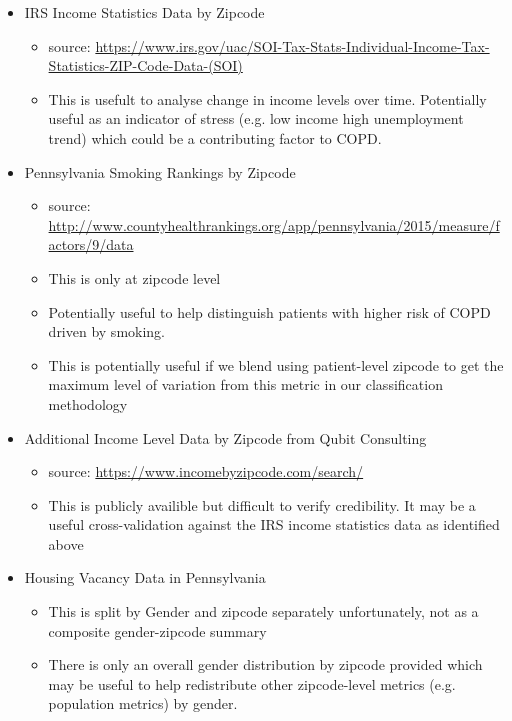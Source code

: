 \documentclass{article}
\begin{document}
\begin{itemize}
  \item  IRS Income Statistics Data by Zipcode
  \begin{itemize}
    \item source: \url{https://www.irs.gov/uac/SOI-Tax-Stats-Individual-Income-Tax-Statistics-ZIP-Code-Data-(SOI)}
    \item This is usefult to analyse change in income levels over time. 
          Potentially useful as an indicator of stress (e.g. low income high 
          unemployment trend) which could be a contributing factor to COPD.
  \end{itemize}
  \item Pennsylvania Smoking Rankings by Zipcode
  \begin{itemize}
    \item source: \url{http://www.countyhealthrankings.org/app/pennsylvania/2015/measure/factors/9/data}
    \item This is only at zipcode level
    \item Potentially useful to help distinguish patients with higher risk of
          COPD driven by smoking.
    \item This is potentially useful if we blend using patient-level zipcode 
          to get the maximum level of variation from this metric in 
          our classification methodology
  \end{itemize}
  \item Additional Income Level Data by Zipcode from Qubit Consulting
  \begin{itemize}
    \item source: \url{https://www.incomebyzipcode.com/search/}
    \item This is publicly availible but difficult to verify credibility. It may 
          be a useful cross-validation against the IRS income statistics 
          data as identified above
  \end{itemize}
  \item Housing Vacancy Data in Pennsylvania
  \begin{itemize}
    \item This is split by Gender and zipcode separately unfortunately, not as
          a composite gender-zipcode summary
    \item There is only an overall gender distribution by zipcode provided 
          which may be useful to help redistribute other zipcode-level metrics 
          (e.g. population metrics) by gender. 
  \end{itemize}

\end{itemize}
\end{document}
